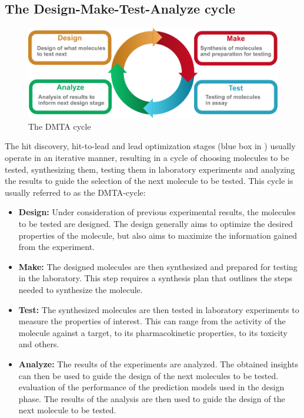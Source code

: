 \subsection{The Design-Make-Test-Analyze cycle}
\begin{figure}
      \centering
      \includegraphics[width=\textwidth]{figures/dmta_cycle.pdf}
      \caption{The DMTA cycle}
\end{figure}
The hit discovery, hit-to-lead and lead optimization stages (blue box in
) usually operate in an iterative manner, resulting in a cycle of
choosing molecules to be tested, synthesizing them, testing them in laboratory experiments and
analyzing the results to guide the selection of the next molecule to be tested. This cycle is
usually referred to as the \ac{DMTA}-cycle:
\begin{itemize}
      \item \textbf{Design:} Under consideration of previous experimental results, the molecules to
            be tested are designed. The design generally aims to optimize the desired properties of
            the molecule, but also aims to maximize the information gained from the experiment.
      \item \textbf{Make:} The designed molecules are then synthesized and prepared for testing in
            the laboratory. This step requires a synthesis plan that outlines the steps needed to
            synthesize the molecule.
      \item \textbf{Test:} The synthesized molecules are then tested in laboratory experiments to
            measure the properties of interest. This can range from the activity of the molecule
            against a target, to its pharmacokinetic properties, to its toxicity and others.
      \item \textbf{Analyze:} The results of the experiments are analyzed. The obtained insights
            can then be used to guide the design of the next molecules to be tested.
            evaluation of the performance of the prediction models used in the design phase. The
            results of the analysis are then used to guide the design of the next molecule to be
            tested.
\end{itemize}

